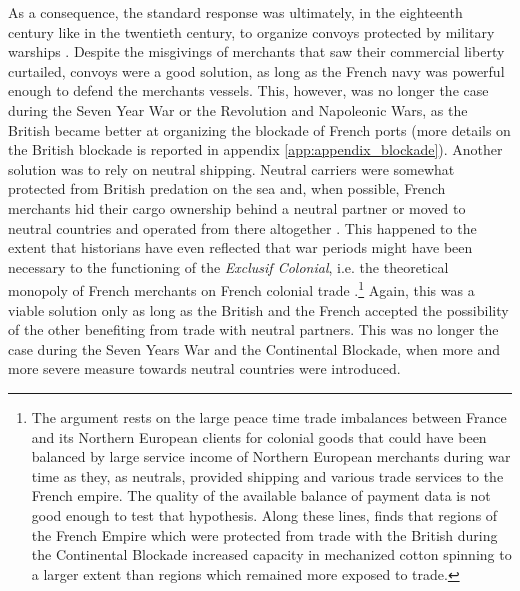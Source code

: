 \documentclass[12pt,a4paper,notitlepage,english]{article}
\begin{document}
As a consequence, the standard response was ultimately, in the eighteenth century like in the twentieth century, to organize convoys protected by military warships \cite[p. 393, 407, 448, 641]{Villiers2002}. Despite the misgivings of merchants that saw their commercial liberty curtailed, convoys were a good solution, as long as the French navy was powerful enough to defend the merchants vessels. This, however, was no longer the case during the Seven Year War or the Revolution and Napoleonic Wars, as the British became better at organizing the blockade of French ports (more details on the British blockade is reported in appendix \ref{app:appendix_blockade}).
Another solution was to rely on neutral shipping. Neutral carriers were somewhat protected from British predation on the sea and, when possible, French merchants hid their cargo ownership behind a neutral partner or moved to neutral countries and operated from there altogether \citep{Marzagalli2016}. This happened to the extent that historians have even reflected that war periods might have been necessary to the functioning of the \textit{Exclusif Colonial}, i.e. the theoretical monopoly of French merchants on French colonial trade \citep{Lespagnol1997, Morineau1997, Marzagalli2016}.\footnote{
The argument rests on the large peace time trade imbalances between France and its Northern European clients for colonial goods that could have been balanced by large service income of Northern European merchants during war time as they, as neutrals, provided shipping and various trade services to the French empire. The quality of the available balance of payment data is not good enough to test that hypothesis. Along these lines, \cite{Juhasz2018} finds that regions of the French Empire which were protected from trade with the British during the Continental Blockade increased capacity in mechanized cotton spinning to a larger extent than regions which remained more exposed to trade.}
Again, this was a viable solution only as long as the British and the French accepted the possibility of the other benefiting from trade with neutral partners. This was no longer the case during the Seven Years War and the Continental Blockade, when more and more severe measure towards neutral countries were introduced. 
\end{document}
